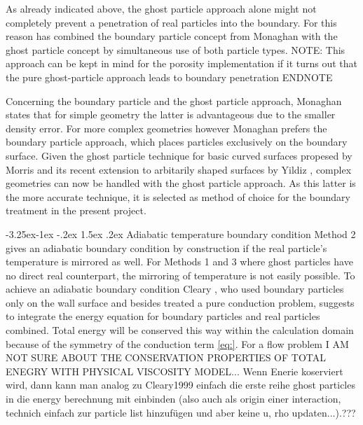 \documentclass{report}
\makeatletter
\renewcommand\paragraph{\@startsection{paragraph}{4}{\z@}%
  {-3.25ex\@plus -1ex \@minus -.2ex}%
  {1.5ex \@plus .2ex}%
  {\normalfont\normalsize\bfseries}}
\makeatother
\begin{document}
As already indicated above, the ghost particle approach alone might not completely prevent a penetration of real particles into the boundary. For this reason \cite{Liu2002} has combined the boundary particle concept from Monaghan with the ghost particle concept by simultaneous use of both particle types.  NOTE: This approach can be kept in mind for the porosity implementation if it turns out that the pure ghost-particle approach leads to boundary penetration ENDNOTE

Concerning the boundary particle and the ghost particle approach, Monaghan \cite{Monaghan2005} states that for simple geometry the latter is advantageous due to the smaller density error. For more complex geometries however Monaghan prefers the boundary particle approach, which places particles exclusively on the boundary surface.
Given the ghost particle technique for basic curved surfaces propesed by Morris \cite{Morris1997, Zhu1999} and its recent extension to arbitarily shaped surfaces by Yildiz \cite{Yildiz2009}, complex geometries can now be handled with the ghost particle approach. As this latter is the more accurate technique, it is selected as method of choice for the boundary treatment in the present project.



\paragraph{Adiabatic temperature boundary condition}
Method 2 gives an adiabatic boundary condition by construction if the real particle's temperature is mirrored as well. 
For Methods 1 and 3 where ghost particles have no direct real counterpart, the mirroring of temperature is not easily possible. To achieve an adiabatic boundary condition Cleary \cite{Cleary1999}, who used boundary particles only on the wall surface and besides treated a pure conduction problem, suggests to integrate the energy equation for boundary particles and real particles combined. Total energy will be conserved this way within the calculation domain because of the symmetry of the conduction term \ref{eq:}.
For a flow problem I AM NOT SURE ABOUT THE CONSERVATION PROPERTIES OF TOTAL ENEGRY WITH PHYSICAL VISCOSITY MODEL...
Wenn Enerie koserviert wird, dann kann man analog zu Cleary1999 einfach die erste reihe ghost particles in die energy berechnung mit einbinden (also auch als origin einer interaction, technich einfach zur particle list hinzufügen und aber keine u, rho updaten...).???
\end{document}
